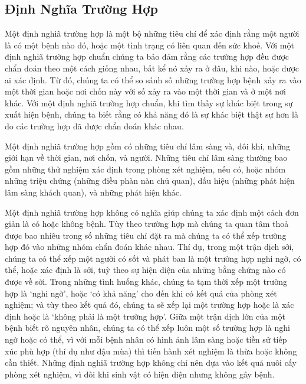 \documentclass[
]{book}
\begin{document}
\hypertarget{ux111ux1ecbnh-nghux129a-trux1b0ux1eddng-hux1ee3p}{%
\subsection{Định Nghĩa Trường Hợp}\label{ux111ux1ecbnh-nghux129a-trux1b0ux1eddng-hux1ee3p}}

Một định nghiã trường hợp là một bộ những tiêu chí để xác định rằng một người là có một bệnh nào đó, hoặc một tình trạng có liên quan đến sức khoẻ. Với một định nghiã trường hợp chuẩn chúng ta bảo đảm rằng các trường hợp đều được chẩn đoán theo một cách giống nhau, bất kể nó xảy ra ở đâu, khi nào, hoặc được ai xác định. Từ đó, chúng ta có thể so sánh số những trường hợp bệnh xảy ra vào một thời gian hoặc nơi chốn này với số xảy ra vào một thời gian và ở một nơi khác. Với một định nghiã trường hợp chuẩn, khi tìm thấy sự khác biệt trong sự xuất hiện bệnh, chúng ta biết rằng có khả năng đó là sự khác biệt thật sự hơn là do các trường hợp đã được chẩn đoán khác nhau.

Một định nghiã trường hợp gồm có những tiêu chí lâm sàng và, đôi khi, những giới hạn về thời gian, nơi chốn, và người. Những tiêu chí lâm sàng thường bao gồm những thử nghiệm xác định trong phòng xét nghiệm, nếu có, hoặc nhóm những triệu chứng (những điều phàn nàn chủ quan), dấu hiệu (những phát hiện lâm sàng khách quan), và những phát hiện khác.

Một định nghiã trường hợp không có nghĩa giúp chúng ta xác định một cách đơn giản là có hoặc không bệnh. Tùy theo trường hợp mà chúng ta quan tâm thoả được bao nhiêu trong số những tiêu chí đặt ra mà chúng ta có thể xếp trường hợp đó vào những nhóm chẩn đoán khác nhau. Thí dụ, trong một trận dịch sởi, chúng ta có thể xếp một người có sốt và phát ban là một trường hợp nghi ngờ, có thể, hoặc xác định là sởi, tuỳ theo sự hiện diện của những bằng chứng nào có được về sởi. Trong những tình huống khác, chúng ta tạm thời xếp một trường hợp là `nghi ngờ', hoặc `có khả năng' cho đến khi có kết quả của phòng xét nghiệm; và tùy theo kết quả đó, chúng ta sẽ xếp lại một trường hợp hoặc là xác định hoặc là `không phải là một trường hợp'. Giữa một trận dịch lớn của một bệnh biết rõ nguyên nhân, chúng ta có thể xếp luôn một số trường hợp là nghi ngờ hoặc có thể, vì với mỗi bệnh nhân có hình ảnh lâm sàng hoặc tiền sử tiếp xúc phù hợp (thí dụ như đậu mùa) thì tiến hành xét nghiệm là thừa hoặc không cần thiết. Những định nghiã trường hợp không chỉ nên dựa vào kết quả nuôi cấy phòng xét nghiệm, vì đôi khi sinh vật có hiện diện nhưng không gây bệnh.
\end{document}
